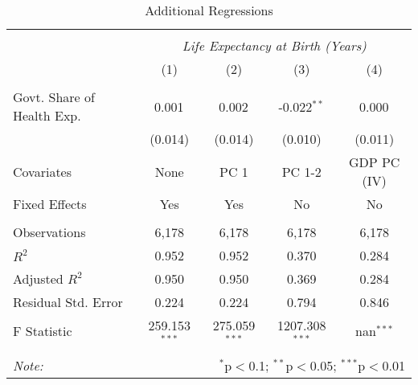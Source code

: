 \begin{table}[!htbp] \centering
  \caption{Additional Regressions \label{additional_regs}}
\begin{tabular}{@{\extracolsep{5pt}}lcccc}
\\[-1.8ex]\hline
\hline \\[-1.8ex]
& \multicolumn{4}{c}{\textit{Life Expectancy at Birth (Years)}} \
\cr \
\\[-1.8ex] & (1) & (2) & (3) & (4) \\
\hline \\[-1.8ex]
 Govt. Share of Health Exp. & 0.001$^{}$ & 0.002$^{}$ & -0.022$^{**}$ & 0.000$^{}$ \\
  & (0.014) & (0.014) & (0.010) & (0.011) \\
 Covariates & None & PC 1 & PC 1-2 & GDP PC (IV) \\
 Fixed Effects & Yes & Yes & No & No \\
\hline \\[-1.8ex]
 Observations & 6,178 & 6,178 & 6,178 & 6,178 \\
 $R^2$ & 0.952 & 0.952 & 0.370 & 0.284 \\
 Adjusted $R^2$ & 0.950 & 0.950 & 0.369 & 0.284 \\
 Residual Std. Error & 0.224 & 0.224 & 0.794 & 0.846  \\
 F Statistic & 259.153$^{***}$  & 275.059$^{***}$  & 1207.308$^{***}$  & nan$^{***}$  \\
\hline
\hline \\[-1.8ex]
\textit{Note:} & \multicolumn{4}{r}{$^{*}$p$<$0.1; $^{**}$p$<$0.05; $^{***}$p$<$0.01} \\
\end{tabular}
\end{table}